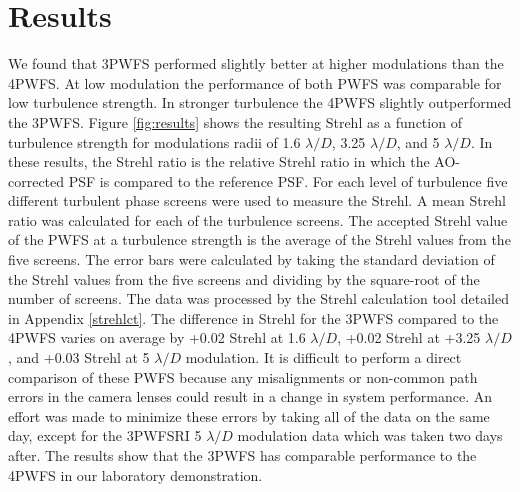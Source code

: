 \section{Results}
We found that 3PWFS performed slightly better at higher modulations than the 4PWFS. At low modulation the performance of both PWFS was comparable for low turbulence strength. In stronger turbulence the 4PWFS slightly outperformed the 3PWFS. Figure \ref{fig:results} shows the resulting Strehl as a function of turbulence strength for modulations radii of 1.6 $\lambda/D$, 3.25 $\lambda/D$, and 5 $\lambda/D$. In these results, the Strehl ratio is the relative Strehl ratio in which the AO-corrected PSF is compared to the reference PSF. For each level of turbulence five different turbulent phase screens were used to measure the Strehl. A mean Strehl ratio was calculated for each of the turbulence screens. The accepted Strehl value of the PWFS at a turbulence strength is the average of the Strehl values from the five screens. The error bars were calculated by taking the standard deviation of the Strehl values from the five screens and dividing by the square-root of the number of screens. The data was processed by the Strehl calculation tool detailed in Appendix \ref{strehlct}. The difference in Strehl for the 3PWFS compared to the 4PWFS varies on average by +0.02 Strehl at 1.6 $\lambda/D$, +0.02 Strehl at +3.25 $\lambda/D$, and +0.03 Strehl at 5 $\lambda/D$ modulation. It is difficult to perform a direct comparison of these PWFS because any misalignments or non-common path errors in the camera lenses could result in a change in system performance. An effort was made to minimize these errors by taking all of the data on the same day, except for the 3PWFSRI 5 $\lambda/D$ modulation data which was taken two days after. The results show that the 3PWFS has comparable performance to the 4PWFS in our laboratory demonstration. 


